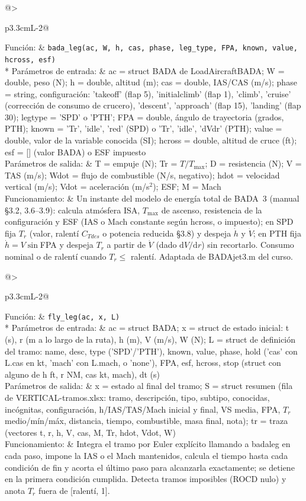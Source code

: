 \documentclass[11pt,a4paper]{article}
\makeatletter
\newcommand{\funcion}[4]{\par\Needspace{8\baselineskip}\begingroup\setlength{\LTleft}{0pt}\setlength{\LTright}{0pt}%
\setlength{\LTpre}{2mm}\setlength{\LTpost}{3mm}%
\begin{longtable}{@{}>{\bfseries\raggedright\arraybackslash}p{3.3cm}L{\dimexpr\linewidth-3.3cm-2\tabcolsep\relax}@{}}\toprule
Función: & \texttt{#1}\\* \midrule
Parámetros de entrada: & #2\\ \midrule
Parámetros de salida: & #3\\ \midrule
Funcionamiento: & #4\\ \bottomrule
\end{longtable}\addtocounter{table}{-1}\endgroup}
\DeclareRobustCommand{\m}[1]{{\ttfamily\def\_{\textunderscore\penalty100\relax}#1}}
\makeatother
\begin{document}
\funcion{bada\_leg(ac, W, h, cas, phase, leg\_type, FPA, known, value, hcross, esf)}
{\m{ac} = struct BADA de \m{LoadAircraftBADA}; \m{W} = double, peso (N); \m{h} = double, altitud (m); \m{cas} = double, IAS/CAS (m/s); \m{phase} = string, configuración: 'takeoff' (flap 5), 'initialclimb' (flap 1), 'climb', 'cruise' (corrección de consumo de crucero), 'descent', 'approach' (flap 15), 'landing' (flap 30); \m{leg\_type} = 'SPD' o 'PTH'; \m{FPA} = double, ángulo de trayectoria (grados, PTH); \m{known} = 'Tr', 'idle', 'red' (SPD) o 'Tr', 'idle', 'dVdr' (PTH); \m{value} = double, valor de la variable conocida (SI); \m{hcross} = double, altitud de cruce (ft); \m{esf} = [] (valor BADA) o ESF impuesto}
{\m{T} = empuje (N); \m{Tr} = $T/T_{\max}$; \m{D} = resistencia (N); \m{V} = TAS (m/s); \m{Wdot} = flujo de combustible (N/s, negativo); \m{hdot} = velocidad vertical (m/s); \m{Vdot} = aceleración (m/s$^2$); \m{ESF}; \m{M} = Mach}
{Un instante del modelo de energía total de BADA~3 (manual §3.2, 3.6--3.9): calcula atmósfera ISA, $T_{\max}$ de ascenso, resistencia de la configuración y ESF (IAS o Mach constante según \m{hcross}, o impuesto); en SPD fija $T_r$ (valor, ralentí $C_{Tdes}$ o potencia reducida §3.8) y despeja $\dot h$ y $\dot V$; en PTH fija $\dot h = V\sin$FPA y despeja $T_r$ a partir de $\dot V$ (dado $\mathrm{d}V/\mathrm{d}r$) sin recortarlo. Consumo nominal o de ralentí cuando $T_r \le$ ralentí. Adaptada de \m{BADA\_jet3.m} del curso.}

\funcion{fly\_leg(ac, x, L)}
{\m{ac} = struct BADA; \m{x} = struct de estado inicial: \m{t} (s), \m{r} (m a lo largo de la ruta), \m{h} (m), \m{V} (m/s), \m{W} (N); \m{L} = struct de definición del tramo: \m{name}, \m{desc}, \m{type} ('SPD'/'PTH'), \m{known}, \m{value}, \m{phase}, \m{hold} ('cas' con \m{L.cas} en kt, 'mach' con \m{L.mach}, o 'none'), \m{FPA}, \m{esf}, \m{hcross}, \m{stop} (struct con alguno de \m{h} ft, \m{r} NM, \m{cas} kt, \m{mach}), \m{dt} (s)}
{\m{x} = estado al final del tramo; \m{S} = struct resumen (fila de \m{VERTICAL-tramos.xlsx}: tramo, descripción, tipo, subtipo, conocidas, incógnitas, configuración, h/IAS/TAS/Mach inicial y final, VS media, FPA, $T_r$ medio/mín/máx, distancia, tiempo, combustible, masa final, nota); \m{tr} = traza (vectores t, r, h, V, cas, M, Tr, hdot, Vdot, W)}
{Integra el tramo por Euler explícito llamando a \m{bada\_leg} en cada paso, impone la IAS o el Mach mantenidos, calcula el tiempo hasta cada condición de fin y acorta el último paso para alcanzarla exactamente; se detiene en la primera condición cumplida. Detecta tramos imposibles (ROCD nulo) y anota $T_r$ fuera de [ralentí, 1].}
\end{document}
